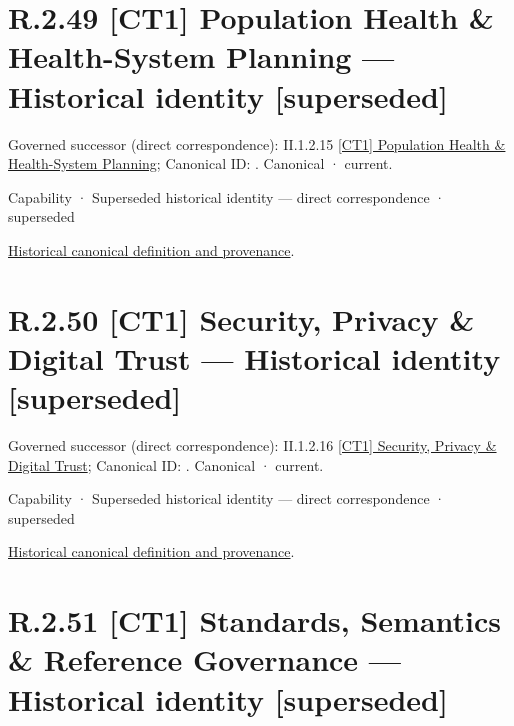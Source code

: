 \section*{R.2.49 [CT1] Population Health \& Health-System Planning — Historical identity [superseded]}
\label{navigation:R.2.49}

{\small Governed successor (direct correspondence): II.1.2.15 \hyperref[element:c63b38b37e9b4e9b97dc87ed54604def]{[CT1] Population Health \& Health-System Planning}; Canonical ID: \texttt{}. Canonical · current.}\par
\label{element:a5003436a7f348b1bff60ba593adfa27}
{\small Capability · Superseded historical identity — direct correspondence · superseded}\par
\href{../../../../../../../continuum/strategy/capability/a5003436a7f348b1bff60ba593adfa27.md}{Historical canonical definition and provenance}.\par
\section*{R.2.50 [CT1] Security, Privacy \& Digital Trust — Historical identity [superseded]}
\label{navigation:R.2.50}

{\small Governed successor (direct correspondence): II.1.2.16 \hyperref[element:71f0431fdfcd4f779e16d9e5ea609833]{[CT1] Security, Privacy \& Digital Trust}; Canonical ID: \texttt{}. Canonical · current.}\par
\label{element:b01441b2f5584fc2b9c3988643a7c93b}
{\small Capability · Superseded historical identity — direct correspondence · superseded}\par
\href{../../../../../../../continuum/strategy/capability/b01441b2f5584fc2b9c3988643a7c93b.md}{Historical canonical definition and provenance}.\par
\section*{R.2.51 [CT1] Standards, Semantics \& Reference Governance — Historical identity [superseded]}
\label{navigation:R.2.51}

